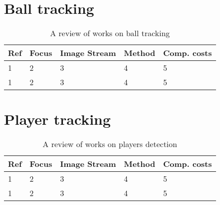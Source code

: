 \section{Ball tracking}

\begin{table}[ht]
	\centering
	\begin{tabular}{  l l l l l  }
		\hline
		\textbf{Ref} & \textbf{Focus} & \textbf{Image Stream} & \textbf{Method} & \textbf{Comp. costs} \\ \hline
		1 & 2 & 3 & 4 & 5 \\
		1 & 2 & 3 & 4 & 5 \\
		\hline
	\end{tabular}
	\caption{A review of works on ball tracking}
	\label{table:ReviewBallTracking}
\end{table}

\section{Player tracking}

\begin{table}[ht]
	\centering
	\begin{tabular}{  l l l l l  }
		\hline
		\textbf{Ref} & \textbf{Focus} & \textbf{Image Stream} & \textbf{Method} & \textbf{Comp. costs} \\ \hline
		1 & 2 & 3 & 4 & 5 \\
		1 & 2 & 3 & 4 & 5 \\
		\hline
	\end{tabular}
	\caption{A review of works on players detection}
	\label{table:ReviewPlayerDetection}
\end{table}
